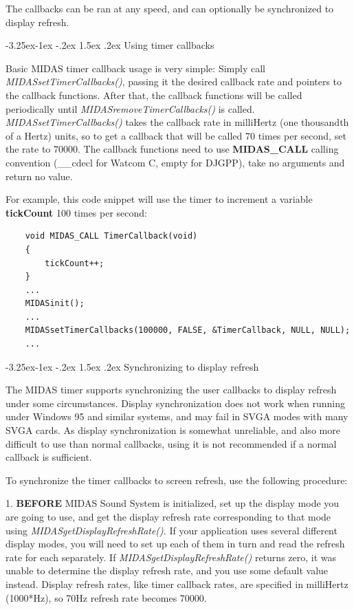 \documentclass[a4paper,12pt,oneside]{book}
\makeatletter
\renewcommand\subsection{\@startsection{subsection}{2}{-20pt}%
                                     {-3.25ex\@plus -1ex \@minus -.2ex}%
                                     {1.5ex \@plus .2ex}%
                                     {\normalfont\large\bfseries}}
\newcommand{\mVariable}[1]{{\bf #1}}
\makeatother
\begin{document}
The callbacks can be ran at any speed, and can optionally be
synchronized to display refresh. 


\subsection{Using timer callbacks}

Basic MIDAS timer callback usage is very simple: Simply call {\em
MIDASsetTimerCallbacks()}, passing it the desired callback rate and
pointers to the callback functions. After that, the callback functions
will be called periodically until {\em MIDASremoveTimerCallbacks()} is
called. {\em MIDASsetTimerCallbacks()} takes the callback rate in
milliHertz (one thousandth of a Hertz) units, so to get a callback that 
will be called 70 times per second, set the rate to 70000. The callback
functions need to use \mVariable{MIDAS\_{}CALL} calling convention
(\_{}\_{}cdecl for Watcom C, empty for DJGPP), take no arguments and
return no value.

For example, this code snippet will use the timer to increment a variable
\mVariable{tickCount} 100 times per second:

\begin{verbatim}
    void MIDAS_CALL TimerCallback(void)
    {
        tickCount++;
    }
    ...
    MIDASinit();
    ...
    MIDASsetTimerCallbacks(100000, FALSE, &TimerCallback, NULL, NULL);
    ...
\end{verbatim}




\subsection{Synchronizing to display refresh}

The MIDAS timer supports synchronizing the user callbacks to display
refresh under some circumstances. Display synchronization does not work
when running under Windows 95 and similar systems, and may fail in SVGA
modes with many SVGA cards. As display synchronization is somewhat
unreliable, and also more difficult to use than normal callbacks, using
it is not recommended if a normal callback is sufficient.

To synchronize the timer callbacks to screen refresh, use the following
procedure: 

1. {\bf BEFORE} MIDAS Sound System is initialized, set up the display mode you
are going to use, and get the display refresh rate corresponding to that
mode using {\em MIDASgetDisplayRefreshRate()}. If your application uses
several different display modes, you will need to set up each of them in
turn and read the refresh rate for each separately. If {\em
MIDASgetDisplayRefreshRate()} returns zero, it was unable to determine
the display refresh rate, and you use some default value
instead. Display refresh rates, like timer callback rates, are specified
in milliHertz (1000*Hz), so 70Hz refresh rate becomes 70000.
\end{document}
